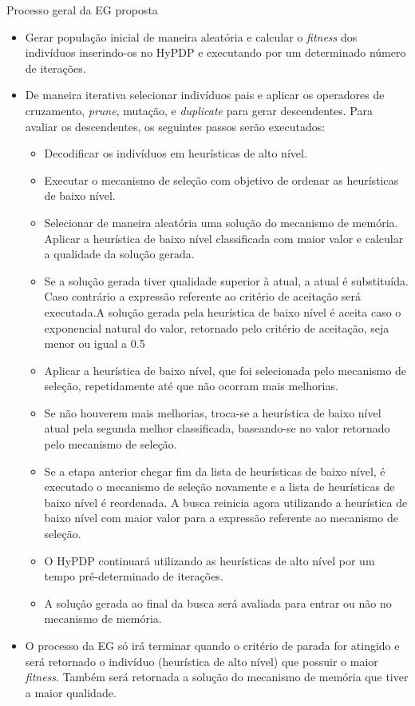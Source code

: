 \begin{frame}[allowframebreaks]{Processo geral da EG proposta}	
	
	\begin{itemize}
		\item Gerar população inicial de maneira aleatória e calcular o \textit{fitness} dos indivíduos inserindo-os no HyPDP e executando por um determinado número de iterações.
		\item De maneira iterativa selecionar indivíduos pais e aplicar os operadores
		de cruzamento, \textit{prune}, mutação, e \textit{duplicate} para gerar descendentes. Para avaliar os descendentes, os seguintes passos serão executados:
		\begin{itemize}
			\item Decodificar os indivíduos em heurísticas de alto nível.
			\item Executar o mecanismo de seleção com objetivo de ordenar as heurísticas de baixo nível.
			\item Selecionar de maneira aleatória uma solução do mecanismo de memória. Aplicar a heurística de baixo nível classificada com maior valor e calcular a qualidade da solução gerada.
			\item Se a solução gerada tiver qualidade superior à atual, a atual é substituída. Caso contrário a expressão referente ao critério de aceitação será executada.A  solução gerada pela
			heurística de baixo nível é aceita caso o exponencial natural do valor, retornado pelo
			critério de aceitação, seja menor ou igual a 0.5
			\item Aplicar a heurística de baixo nível, que foi selecionada pelo mecanismo de seleção,
			repetidamente até que não ocorram mais melhorias.
			\item Se não houverem mais melhorias, troca-se a heurística de baixo nível atual pela
			segunda melhor classificada, baseando-se no valor retornado pelo mecanismo de
			seleção.
			\item Se a etapa anterior chegar fim da lista de heurísticas de baixo nível, é executado o
			mecanismo de seleção novamente e a lista de heurísticas de baixo nível é reordenada.
			A busca reinicia agora utilizando a heurística de baixo nível com maior valor para
			a expressão referente ao mecanismo de seleção.
			\item O HyPDP continuará utilizando as heurísticas de alto
			nível por um tempo pré-determinado
			de iterações.
			\item A solução gerada ao final da busca será avaliada para
			entrar ou não no mecanismo de memória.
		\end{itemize}
		\item O processo da EG só irá terminar quando o critério de parada for atingido e será retornado o indivíduo (heurística de alto nível) que possuir o maior \textit{fitness}. Também será retornada a solução do mecanismo de memória que tiver a maior qualidade.
	\end{itemize}

\end{frame}



